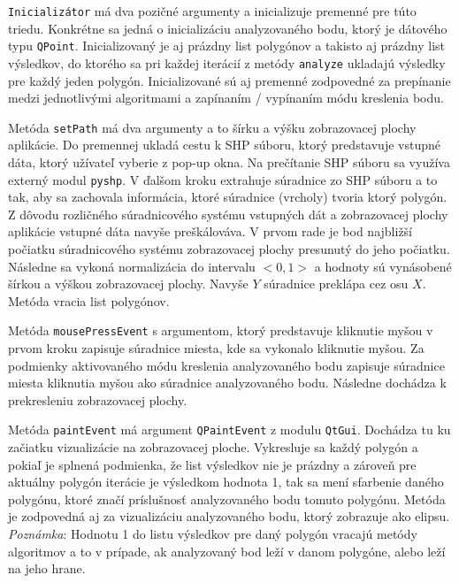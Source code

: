 \documentclass[11pt]{article}
\begin{document}
\begin{enumerate}
\texttt{Inicializátor} má dva pozičné argumenty a inicializuje premenné pre túto triedu. Konkrétne sa jedná o inicializáciu analyzovaného bodu, ktorý je dátového typu \texttt{QPoint}. Inicializovaný je aj prázdny list polygónov a takisto aj prázdny list výsledkov, do ktorého sa pri každej iterácií z metódy \texttt{analyze} ukladajú výsledky pre každý jeden polygón. \newline
Inicializované sú aj premenné zodpovedné za prepínanie medzi jednotlivými algoritmami a zapínaním / vypínaním módu kreslenia bodu.

Metóda \texttt{setPath} má dva argumenty a to šírku a výšku zobrazovacej plochy aplikácie. Do premennej ukladá cestu k SHP súboru, ktorý predstavuje vstupné dáta, ktorý užívateľ vyberie z pop-up okna. Na prečítanie SHP súboru sa využíva externý modul \texttt{pyshp}. \newline
V ďalšom kroku extrahuje súradnice zo SHP súboru a to tak, aby sa zachovala informácia, ktoré súradnice (vrcholy) tvoria ktorý polygón.\newline
Z dôvodu rozličného súradnicového systému vstupných dát a zobrazovacej plochy aplikácie vstupné dáta navyše preškálováva. V prvom rade je bod najbližší počiatku súradnicového systému zobrazovacej plochy presunutý do jeho počiatku. Následne sa vykoná normalizácia do intervalu $<0, 1>$ a hodnoty sú vynásobené šírkou a výškou zobrazovacej plochy. Navyše $Y$ súradnice preklápa cez osu $X$. \newline
Metóda vracia list polygónov.

Metóda \texttt{mousePressEvent} s argumentom, ktorý predstavuje kliknutie myšou v prvom kroku zapisuje súradnice miesta, kde sa vykonalo kliknutie myšou. Za podmienky aktivovaného módu kreslenia analyzovaného bodu zapisuje súradnice miesta kliknutia myšou ako súradnice analyzovaného bodu. Následne dochádza k prekresleniu zobrazovacej plochy.

Metóda \texttt{paintEvent} má argument \texttt{QPaintEvent} z modulu \texttt{QtGui}. Dochádza tu ku začiatku vizualizácie na zobrazovacej ploche. Vykresluje sa každý polygón a pokiaľ je splnená podmienka, že list výsledkov nie je prázdny a zároveň pre aktuálny polygón iterácie je výsledkom hodnota 1, tak sa mení sfarbenie daného polygónu, ktoré značí príslušnosť analyzovaného bodu tomuto polygónu. Metóda je zodpovedná aj za vizualizáciu analyzovaného bodu, ktorý zobrazuje ako elipsu.\newline
\textit{Poznámka}: Hodnotu 1 do listu výsledkov pre daný polygón vracajú metódy algoritmov a to v prípade, ak analyzovaný bod leží v danom polygóne, alebo leží na jeho hrane.


\end{enumerate}
\end{document}
